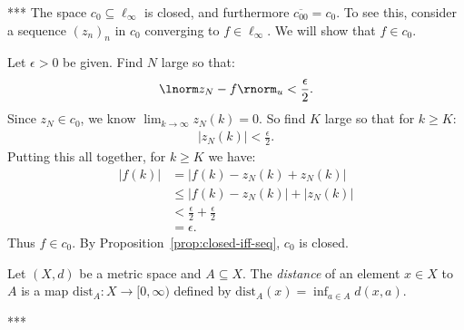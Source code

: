     \begin{example}***
        The space $c_0 \subseteq \ell_\infty$ is closed, and furthermore $\overline{c_{00}} = c_0$. To see this, consider a sequence $(z_n)_n$ in $c_0$ converging to $f \in \ell_\infty$. We will show that $f \in c_0$.

        Let $\epsilon > 0$ be given. Find $N$ large so that:
            \begin{equation*}
            \begin{split}
                \lnorm z_N - f \rnorm_u < \frac{\epsilon}{2}.
            \end{split}
            \end{equation*}
        Since $z_N \in c_0$, we know $\lim_{k \rightarrow \infty}z_N(k) = 0$. So find $K$ large so that for $k \geq K$:
            \begin{equation*}
            \begin{split}
                |z_N(k)| < \frac{\epsilon}{2}.
            \end{split}
            \end{equation*}
        Putting this all together, for $k \geq K$ we have:
            \begin{equation*}
            \begin{split}
                |f(k)|
                & = |f(k) - z_N(k) + z_N(k)| \\
                & \leq |f(k) - z_N(k)| + |z_N(k)| \\
                & < \frac{\epsilon}{2} + \frac{\epsilon}{2} \\
                & = \epsilon.
            \end{split}
            \end{equation*}
        Thus $f \in c_0$. By Proposition~\ref{prop:closed-iff-seq}, $c_0$ is closed.
    \end{example}

    \begin{definition}
        Let $(X,d)$ be a metric space and $A \subseteq X$. The \textit{distance} of an element $x \in X$ to $A$ is a map $\text{dist}_A:X \rightarrow [0,\infty)$ defined by $\text{dist}_A(x) = \inf_{a \in A}d(x,a)$.
    \end{definition}

    \begin{proposition}***
        
    \end{proposition}

